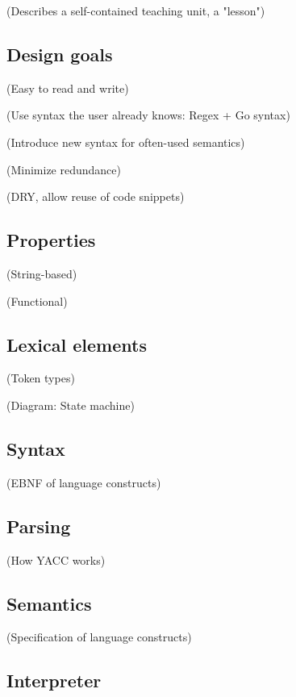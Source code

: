 \documentclass[twoside]{scrreprt}
\begin{document}
                (Describes a self-contained teaching unit, a "lesson")

\subsection{Design goals}

                (Easy to read and write)

                    (Use syntax the user already knows: Regex + Go syntax)

                    (Introduce new syntax for often-used semantics)

                (Minimize redundance)

                    (DRY, allow reuse of code snippets)

\subsection{Properties}

                (String-based)

                (Functional)

\subsection{Lexical elements}

                (Token types)

                (Diagram: State machine)

\subsection{Syntax}

                (EBNF of language constructs)

\subsection{Parsing}

                (How YACC works)

\subsection{Semantics}

                (Specification of language constructs)

\subsection{Interpreter}
\end{document}
